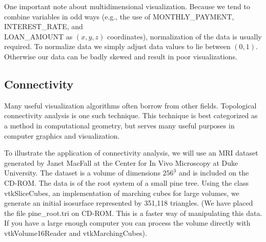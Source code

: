 One important note about multidimensional visualization. Because we tend to combine variables in odd ways (e.g., the use of MONTHLY\_PAYMENT, INTEREST\_RATE, and \\ LOAN\_AMOUNT as $(x, y, z)$ coordinates), normalization of the data is usually required. To normalize data we simply adjust data values to lie between $(0,1)$. Otherwise our data can be badly skewed and result in poor visualizations.

\subsection{Connectivity}

Many useful visualization algorithms often borrow from other fields. Topological connectivity analysis is one such technique. This technique is best categorized as a method in computational geometry, but serves many useful purposes in computer graphics and visualization.

To illustrate the application of connectivity analysis, we will use an MRI dataset generated by Janet MacFall at the Center for In Vivo Microscopy at Duke University. The dataset is a volume of dimensions $256^3$ and is included on the CD-ROM. The data is of the root system of a small pine tree. Using the class vtkSliceCubes, an implementation of marching cubes for large volumes, we generate an initial isosurface represented by 351,118 triangles. (We have placed the file pine\_root.tri on CD-ROM. This is a faster way of manipulating this data. If you have a large enough computer you can process the volume directly with vtkVolume16Reader and vtkMarchingCubes).

